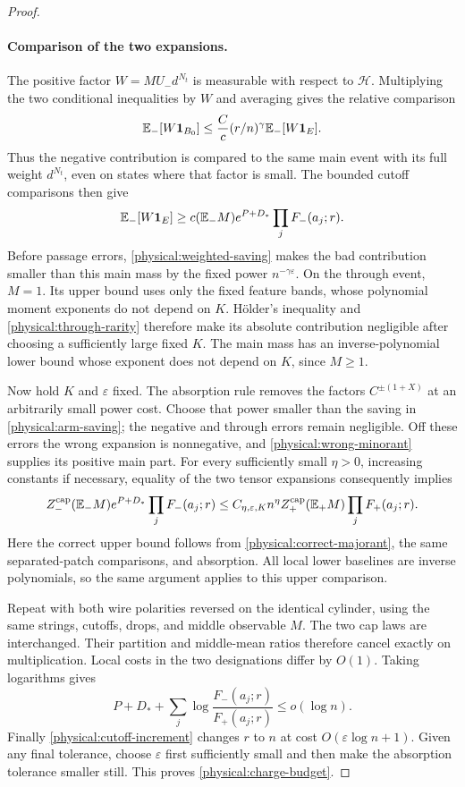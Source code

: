 \begin{proof}
\paragraph{Comparison of the two expansions.}
The positive factor \(W=M U_-d^{N_t}\) is measurable with respect
to \(\mathcal H\).  Multiplying the two conditional inequalities by
\(W\) and averaging gives the relative comparison
\begin{equation}\label{physical:weighted-saving}
 \mathbb E_-[W\mathbf 1_{B_0}]
 \le \frac Cc(r/n)^\gamma\mathbb E_-[W\mathbf 1_E].
\end{equation}
Thus the negative contribution is compared to the same main event with
its full weight \(d^{N_t}\), even on states where that factor is small.
The bounded cutoff comparisons then give
\begin{equation}\label{physical:main-mass}
 \mathbb E_-[W\mathbf 1_E]\ge
 c(\mathbb E_-M)e^{P+D_*}\prod_jF_-(a_j;r).
\end{equation}
Before passage errors, \eqref{physical:weighted-saving} makes the bad
contribution smaller than this main mass by the fixed power
\(n^{-\gamma\varepsilon}\).
On the through event, \(M=1\). Its upper bound uses only the fixed
feature bands, whose polynomial moment exponents do not depend on
\(K\). H\"older's inequality and
\eqref{physical:through-rarity} therefore make its absolute
contribution negligible after choosing a sufficiently large fixed
\(K\). The main mass has an inverse-polynomial lower bound whose
exponent does not depend on \(K\), since \(M\ge1\).

Now hold \(K\) and \(\varepsilon\) fixed. The absorption rule
removes the factors \(C^{\pm(1+X)}\) at an arbitrarily small power
cost. Choose that power smaller than the saving in
\eqref{physical:arm-saving}; the negative and through errors remain
negligible. Off these errors the wrong expansion is nonnegative,
and \eqref{physical:wrong-minorant} supplies its positive main part.
For every sufficiently small \(\eta>0\), increasing constants
if necessary, equality of the two tensor expansions consequently
implies
\[
 Z_-^{\rm cap}(\mathbb E_-M)e^{P+D_*}\prod_jF_-(a_j;r)
 \le C_{\eta,\varepsilon,K}n^\eta
 Z_+^{\rm cap}(\mathbb E_+M)\prod_jF_+(a_j;r).
\]
Here the correct upper bound follows from
\eqref{physical:correct-majorant}, the same separated-patch
comparisons, and absorption. All local lower baselines are inverse
polynomials, so the same argument applies to this upper comparison.

Repeat with both wire polarities reversed on the identical cylinder,
using the same strings, cutoffs, drops, and middle observable \(M\).
The two cap laws are interchanged. Their partition and middle-mean
ratios therefore cancel exactly on multiplication. Local costs in
the two designations differ by \(O(1)\). Taking logarithms gives
\[
 P+D_*+\sum_j\log\frac{F_-(a_j;r)}{F_+(a_j;r)}
 \le o(\log n).
\]
Finally \eqref{physical:cutoff-increment} changes \(r\) to \(n\)
at cost \(O(\varepsilon\log n+1)\). Given any final tolerance,
choose \(\varepsilon\) first sufficiently small and then make the
absorption tolerance smaller still. This proves
\eqref{physical:charge-budget}.
\end{proof}
